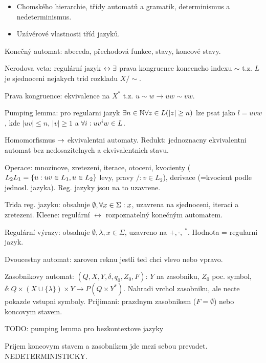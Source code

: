 \begin{itemize}
\item Chomského hierarchie, třídy automatů a gramatik, determinismus a
nedeterminismus.
\item Uzávěrové vlastnosti tříd jazyků.
\end{itemize}

\begin{understood}
Konečný automat: abeceda, přechodová funkce, stavy, koncové stavy.

Nerodova veta: regulární jazyk $\leftrightarrow \exists$ prava kongruence konecneho
indexu $\sim$ t.z. $L$ je sjednoceni nejakych trid rozkladu $X/\sim$.
\end{understood}

Prava kongruence: ekvivalence na $X^*$ t.z. $u\sim w\rightarrow uw\sim vw$.

Pumping lemma: pro regularni jazyk $\exists n\in\mathbb{N} \forall z\in L (|z|\geq n)$ lze
psat jako $l=uvw$, kde $|uv|\leq n$, $|v|\geq 1$ a $\forall i: uv^i w\in L$.

Homomorfismus $\rightarrow$ ekvivalentni automaty. Redukt: jednoznacny
ekvivalentni automat bez nedosazitelnych a ekvivalentnich stavu.

Operace: mnozinove, zretezeni, iterace, otoceni, kvocienty ($L_2\\ L_1=\{u:uv\in
L_1, u\in L_2\}$ levy, pravy $/: v\in L_2$), derivace (=kvocient podle jednosl.
jazyka). Reg. jazyky jsou na to uzavrene.

\begin{understood}
Trida reg. jazyku: obsahuje $\emptyset, \forall x\in\Sigma: x$, uzavrena na
sjednoceni, iteraci a zretezeni. Kleene: regulární $\leftrightarrow$
rozpoznatelný konečným automatem.

Regulární výrazy: obsahuje $\emptyset, \lambda, x\in\Sigma$, uzavreno na
$+,\cdot,\ ^*$. Hodnota = regularni jazyk.
\end{understood}

Dvoucestny automat: zaroven reknu jestli ted chci vlevo nebo vpravo.

Zasobnikovy automat: $(Q,X,Y,\delta,q_0,Z_0,F)$: $Y$ na zasobniku, $Z_0$ poc.
symbol, $\delta:Q\times (X\cup\{\lambda\})\times Y\rightarrow P(Q\times Y^*)$.
Nahradi vrchol zasobniku, ale necte pokazde vstupni symboly.
Prijimani: prazdnym zasobnikem ($F=\emptyset$) nebo koncovym stavem.

TODO: pumping lemma pro bezkontextove jazyky

Prijem koncovym stavem a zasobnikem jde mezi sebou prevadet.
NEDETERMINISTICKY.

